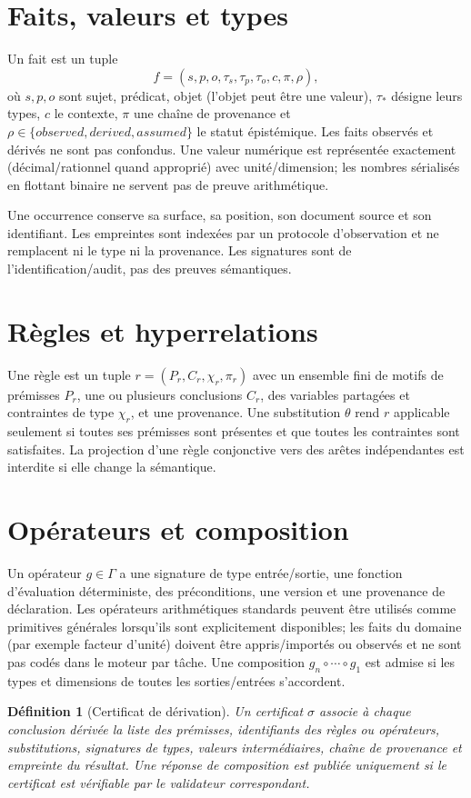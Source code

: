\documentclass[11pt,a4paper]{book}
\newtheorem{definition}{Définition}[chapter]
\begin{document}
\section{Faits, valeurs et types}
Un fait est un tuple
\[
 f=(s,p,o,\tau_s,\tau_p,\tau_o,c,\pi,\rho),
\]
où $s,p,o$ sont sujet, prédicat, objet (l'objet peut être une valeur), $\tau_*$ désigne leurs types, $c$ le contexte, $\pi$ une chaîne de provenance et $\rho\in\{observed,derived,assumed\}$ le statut épistémique. Les faits observés et dérivés ne sont pas confondus. Une valeur numérique est représentée exactement (décimal/rationnel quand approprié) avec unité/dimension; les nombres sérialisés en flottant binaire ne servent pas de preuve arithmétique.

Une occurrence conserve sa surface, sa position, son document source et son identifiant. Les empreintes sont indexées par un protocole d'observation et ne remplacent ni le type ni la provenance. Les signatures sont de l'identification/audit, pas des preuves sémantiques.

\section{Règles et hyperrelations}
Une règle est un tuple $r=(P_r,C_r,\chi_r,\pi_r)$ avec un ensemble fini de motifs de prémisses $P_r$, une ou plusieurs conclusions $C_r$, des variables partagées et contraintes de type $\chi_r$, et une provenance. Une substitution $\theta$ rend $r$ applicable seulement si toutes ses prémisses sont présentes et que toutes les contraintes sont satisfaites. La projection d'une règle conjonctive vers des arêtes indépendantes est interdite si elle change la sémantique.

\section{Opérateurs et composition}
Un opérateur $g\in\Gamma$ a une signature de type entrée/sortie, une fonction d'évaluation déterministe, des préconditions, une version et une provenance de déclaration. Les opérateurs arithmétiques standards peuvent être utilisés comme primitives générales lorsqu'ils sont explicitement disponibles; les faits du domaine (par exemple facteur d'unité) doivent être appris/importés ou observés et ne sont pas codés dans le moteur par tâche. Une composition $g_n\circ\cdots\circ g_1$ est admise si les types et dimensions de toutes les sorties/entrées s'accordent.

\begin{definition}[Certificat de dérivation]
Un certificat $\sigma$ associe à chaque conclusion dérivée la liste des prémisses, identifiants des règles ou opérateurs, substitutions, signatures de types, valeurs intermédiaires, chaîne de provenance et empreinte du résultat. Une réponse de composition est publiée uniquement si le certificat est vérifiable par le validateur correspondant.
\end{definition}
\end{document}
